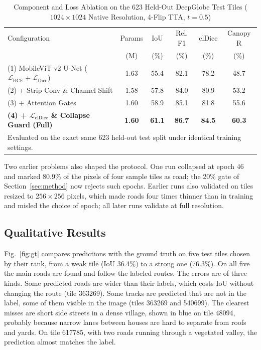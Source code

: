 \documentclass{ieeeaccess}
\begin{document}
\begin{table}[t]
\centering
\caption{Component and Loss Ablation on the 623 Held-Out DeepGlobe Test Tiles ($1024 \times 1024$ Native Resolution, 4-Flip TTA, $t=0.5$)}
\label{tab:arch_ablation}
\setlength{\tabcolsep}{4pt}
\tablebodyfont
\begin{tabular}{|l|c|c|c|c|c|}
\hline
Configuration & Params & IoU & Rel. F1 & clDice & Canopy R \\
 & (M) & (\%) & (\%) & (\%) & (\%) \\
\hline
(1) MobileViT v2 U-Net ($\mathcal{L}_{\mathrm{BCE}} + \mathcal{L}_{\mathrm{Dice}}$) & 1.63 & 55.4 & 82.1 & 78.2 & 48.7 \\
(2) + Strip Conv \& Channel Shift & 1.58 & 57.8 & 84.0 & 80.9 & 53.2 \\
(3) + Attention Gates & 1.60 & 58.9 & 85.1 & 81.8 & 55.6 \\
\textbf{(4) + $\mathcal{L}_{\mathrm{clDice}}$ \& Collapse Guard (Full)} & \textbf{1.60} & \textbf{61.1} & \textbf{86.7} & \textbf{84.5} & \textbf{60.3} \\
\hline
\multicolumn{6}{p{230pt}}{Evaluated on the exact same 623 held-out test split under identical training settings.}
\end{tabular}
\end{table}

Two earlier problems also shaped the protocol. One run collapsed at epoch 46 and marked 80.9\% of the pixels of four sample tiles as road; the 20\% gate of Section~\ref{sec:method} now rejects such epochs. Earlier runs also validated on tiles resized to $256 \times 256$ pixels, which made roads four times thinner than in training and misled the choice of epoch; all later runs validate at full resolution.

\subsection{Qualitative Results}

Fig.~\ref{fig:gt} compares predictions with the ground truth on five test tiles chosen by their rank, from a weak tile (IoU 36.4\%) to a strong one (76.3\%). On all five the main roads are found and follow the labeled routes. The errors are of three kinds. Some predicted roads are wider than their labels, which costs IoU without changing the route (tile 363269). Some tracks are predicted that are not in the label, some of them visible in the image (tiles 363269 and 540699). The clearest misses are short side streets in a dense village, shown in blue on tile 48094, probably because narrow lanes between houses are hard to separate from roofs and yards. On tile 617785, with two roads running through a vegetated valley, the prediction almost matches the label.
\end{document}
